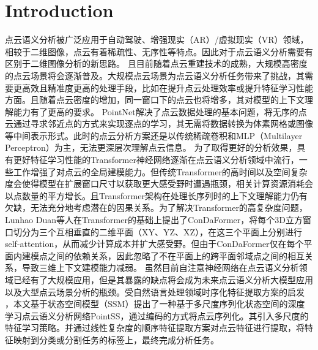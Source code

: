 \documentclass[preprint,12pt]{elsarticle}
\begin{document}


\section{Introduction}
\label{sec1}
点云语义分析被广泛应用于自动驾驶、增强现实（AR）/虚拟现实（VR）领域，相较于二维图像，点云有着稀疏性、无序性等特点。因此对于点云语义分析需要有区别于二维图像分析的新思路。
且目前随着点云重建技术的成熟，大规模高密度的点云场景将会逐渐普及。大规模点云场景为点云语义分析任务带来了挑战\cite{Vertex}，其需要更高效且精准度更高的处理手段，比如在提升点云处理效率或提升特征学习性能方面。且随着点云密度的增加，同一窗口下的点云也将增多，其对模型的上下文理解能力有了更高的要求。
PointNet\cite{pointnet}解决了点云数据处理的基本问题，将无序的点云通过寻求邻近点的方式来实现逐点的学习，其无需将数据转换为体素网格或图像等中间表示形式。此时的点云分析方案还是以传统稀疏卷积和MLP（Multilayer Perceptron）为主，无法更深层次理解点云信息。
为了取得更好的分析效果，具有更好特征学习性能的Transformer神经网络逐渐在点云语义分析领域中流行，一些工作\cite{pt,ptv3,superpoint,OctFormer,MSDCNN,C2BG}增强了对点云的全局建模能力。但传统Transformer的高时间以及空间复杂度会使得模型在扩展窗口尺寸以获取更大感受野时遭遇瓶颈，相关计算资源消耗会以点数量的平方增长。且Transformer架构在处理长序列时的上下文理解能力仍有欠缺，无法充分地考虑潜在的因果关系。为了解决Transformer的高复杂度问题，Lunhao Duan等人在Transformer的基础上提出了ConDaFormer\cite{ConDaFormer}，将每个3D立方窗口切分为三个互相垂直的二维平面（XY、YZ、XZ），在这三个平面上分别进行 self-attention，从而减少计算成本并扩大感受野。但由于ConDaFormer仅在每个平面内建模点之间的依赖关系，因此忽略了不在平面上的跨平面邻域点之间的相互关系，导致三维上下文建模能力减弱。
虽然目前自注意神经网络在点云语义分析领域已经有了大规模应用，但是其暴露的缺点将会成为未来点云语义分析大模型应用以及大型点云场景分析的瓶颈。受自然语言处理领域时序化特征提取方案的启发 \cite{ssm,Mamba,Lstm}，本文基于状态空间模型（SSM）提出了一种基于多尺度序列化状态空间的深度学习点云语义分析网络PointSS，通过编码的方式将点云序列化。其引入多尺度的特征学习策略\cite{Pyramid}。并通过线性复杂度的顺序特征提取方案对点云特征进行提取，将特征映射到分类或分割任务的标签上，最终完成分析任务。
\end{document}
